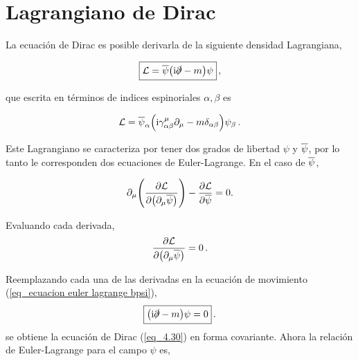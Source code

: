 \section{Lagrangiano de Dirac}

La ecuación de Dirac es posible derivarla de la siguiente densidad Lagrangiana,

\begin{equation}
	\boxed{	\mathcal{L} = \overline{\psi} \qty( \mathrm{i} \slashed{\partial} - m ) \psi}\, ,
	\label{eq_lagrangiano de Dirac}
\end{equation}

que escrita en términos de indices espinoriales $\alpha, \beta$ es

\begin{equation}
	\mathcal{L} = \overline{\psi}_\alpha \qty( \mathrm{i} \gamma^\mu_{\alpha \beta} \partial_\mu - m \delta_{\alpha \beta}  ) \psi_{\beta} \, .
\end{equation}

Este Lagrangiano se caracteriza por tener dos grados de libertad $\psi$ y $\overline{\psi}$, por lo tanto le corresponden dos ecuaciones de Euler-Lagrange. En el caso de $\overline{\psi}$,

\begin{equation}
	\partial_\mu \qty( \pdv{\mathcal{L}}{\qty( \partial_\mu \overline{\psi})} ) - \pdv{\mathcal{L}}{\overline{\psi}} = 0.
	\label{eq_ecuacion euler lagrange bpsi}
\end{equation}

Evaluando cada derivada,
\begin{equation*}
		\pdv{\mathcal{L}}{\qty( \partial_\mu \overline{\psi})} = 0 \, .
\end{equation*}
Reemplazando cada una de las derivadas en la ecuación de movimiento (\ref{eq_ecuacion euler lagrange bpsi}),
\begin{equation}
	\boxed{ \qty(\mathrm{i} \slashed{\partial} -m)\psi = 0 }\, .
\end{equation}
se obtiene la ecuación de Dirac (\ref{eq_4.30}) en forma covariante. Ahora la relación de Euler-Lagrange para el campo $\psi$ es,


